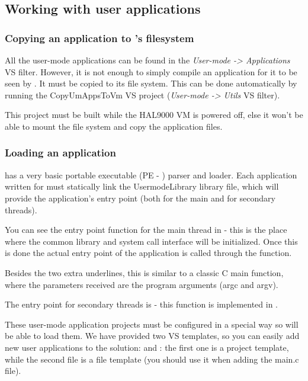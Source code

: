 \subsection{Working with user applications}

\subsubsection{Copying an application to \projectname's filesystem}

All the user-mode applications can be found in the \textit{User-mode -> Applications} VS filter.
However, it is not enough to simply compile an application for it to be seen by \projectname. It
must be copied to its file system. This can be done automatically by running the CopyUmAppsToVm
VS project (\textit{User-mode -> Utils} VS filter).

This project must be built while the HAL9000 VM is powered off, else it won't be able to mount the
file system and copy the application files.

\subsubsection{Loading an application}
\label{sect:AppLoad}

\projectname has a very basic portable executable (PE - \cite{msdnPE}) parser and loader. Each
application written for \projectname must statically link the UsermodeLibrary library file, which 
will provide the application's entry point (both for the main and for secondary threads).

You can see the entry point function for the main thread  in  - this
is the place where the common library and system call interface will be initialized. Once this is
done the actual entry point of the application is called through the  function.

Besides the two extra underlines, this is similar to a classic C main function, where the parameters
received are the program arguments (argc and argv).

The entry point for secondary threads is  - this function is implemented in
.

These user-mode application projects must be configured in a special way so \projectname will be
able to load them. We have provided two VS templates, so you can easily add new user applications to
the solution:  and : the first one is
a project template, while the second file is a file template (you should use it when adding the
main.c file).

